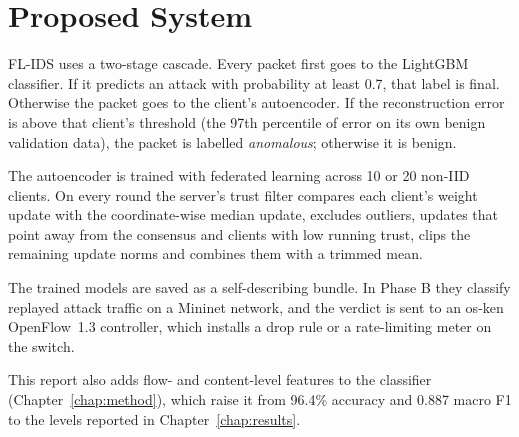 \section{Proposed System}
FL-IDS uses a two-stage cascade. Every packet first goes to the LightGBM classifier. If it predicts an attack with probability at least 0.7, that label is final. Otherwise the packet goes to the client's autoencoder. If the reconstruction error is above that client's threshold (the 97th percentile of error on its own benign validation data), the packet is labelled \emph{anomalous}; otherwise it is benign.

The autoencoder is trained with federated learning across 10 or 20 non-IID clients. On every round the server's trust filter compares each client's weight update with the coordinate-wise median update, excludes outliers, updates that point away from the consensus and clients with low running trust, clips the remaining update norms and combines them with a trimmed mean.

The trained models are saved as a self-describing bundle. In Phase B they classify replayed attack traffic on a Mininet network, and the verdict is sent to an os-ken OpenFlow~1.3 controller, which installs a drop rule or a rate-limiting meter on the switch.

This report also adds flow- and content-level features to the classifier (Chapter~\ref{chap:method}), which raise it from 96.4\% accuracy and 0.887 macro F1 to the levels reported in Chapter~\ref{chap:results}.

